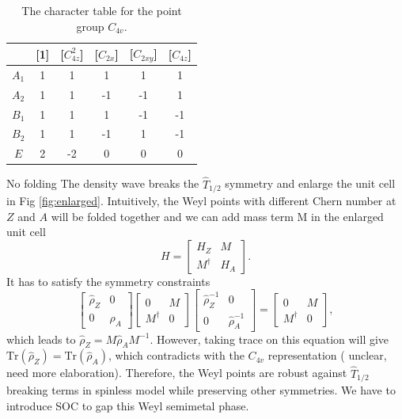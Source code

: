  \begin{table}[h]
 \begin{tabular}{c|ccccc}
 &[1]&[$C_{4z}^2$]&[$C_{2x}$]&[$C_{2xy}$]&[$C_{4z}$]\\
 \hline 
 $A_1$&1&1&1&1&1\\
 $A_2$&1&1&-1&-1&1\\
 $B_1$&1&1&1&-1&-1\\
 $B_2$&1&1&-1&1&-1\\
 $E$&2&-2&0&0&0
 \end{tabular}
 \caption{The character table for the point group $C_{4v}$.} \label{C4spinlessCharacterTable}
 \end{table}

{\color{red} No folding} 
The density wave breaks the $\hat{T}_{1/2}$ symmetry and enlarge the unit cell in Fig \ref{fig:enlarged}. Intuitively, the Weyl points with different Chern number at $Z$ and $A$ will be folded together and we can add mass term M in the enlarged unit cell
\begin{equation}
    H= \begin{bmatrix}
    H_Z & M \\
    M^\dagger & H_A 
    \end{bmatrix}.
\end{equation}
It has to satisfy the symmetry constraints
\begin{equation}
    \begin{bmatrix}
    \hat{\rho}_Z & 0 \\
    0 & \hat{\rho}_A 
    \end{bmatrix}\begin{bmatrix}
    0 & M \\
    M^\dagger & 0 
    \end{bmatrix}
    \begin{bmatrix}
    \hat{\rho}_Z^{-1} & 0 \\
    0 & \hat{\rho}_A^{-1} 
    \end{bmatrix}
    =
    \begin{bmatrix}
    0 & M \\
    M^\dagger & 0 
    \end{bmatrix} ,
\end{equation}
which leads to $\hat{\rho}_Z=M\hat{\rho}_AM^{-1}$. However, taking trace on this equation will give $\mathrm{Tr}(\hat{\rho}_Z) = \mathrm{Tr}(\hat{\rho}_A)$, which contradicts with the $C_{4v}$ representation ({\color{red} unclear, need more elaboration}). Therefore, the Weyl points are robust against $\hat{T}_{1/2}$ breaking terms in spinless model while preserving other symmetries. We have to introduce SOC to gap this Weyl semimetal phase. 

